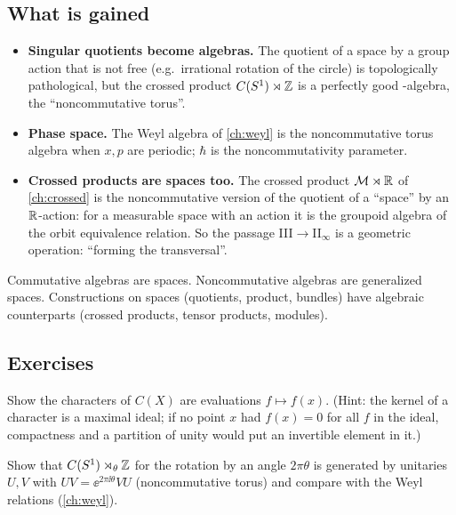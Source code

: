 \subsection{What is gained}
\begin{itemize}
\item \textbf{Singular quotients become algebras.} The quotient of a space by a group action that is not free (e.g.\ irrational rotation of the circle) is topologically pathological, but the crossed product $C(S^1)\rtimes\mathbb{Z}$ is a perfectly good \cstar-algebra, the ``noncommutative torus''.
\item \textbf{Phase space.} The Weyl algebra of \cref{ch:weyl} is the noncommutative torus algebra when $x,p$ are periodic; $\hbar$ is the noncommutativity parameter.
\item \textbf{Crossed products are spaces too.} The crossed product $\mathcal{M}\rtimes\mathbb{R}$ of \cref{ch:crossed} is the noncommutative version of the quotient of a ``space'' by an $\mathbb{R}$-action: for a measurable space with an action it is the groupoid algebra of the orbit equivalence relation. So the passage III$\to$II$_\infty$ is a geometric operation: ``forming the transversal''.
\end{itemize}

\begin{keyidea}
Commutative algebras are spaces. Noncommutative algebras are generalized spaces. Constructions on spaces (quotients, product, bundles) have algebraic counterparts (crossed products, tensor products, modules).
\end{keyidea}

\subsection*{Exercises}
\begin{exercise}\label{ex:gelfand:1}
Show the characters of $C(X)$ are evaluations $f\mapsto f(x)$. (Hint: the kernel of a character is a maximal ideal; if no point $x$ had $f(x)=0$ for all $f$ in the ideal, compactness and a partition of unity would put an invertible element in it.)
\end{exercise}
\begin{exercise}\label{ex:gelfand:2}
Show that $C(S^1)\rtimes_\theta\mathbb{Z}$ for the rotation by an angle $2\pi\theta$ is generated by unitaries $U,V$ with $UV=\ee^{2\pi\ii\theta}VU$ (noncommutative torus) and compare with the Weyl relations (\cref{ch:weyl}).
\end{exercise}

